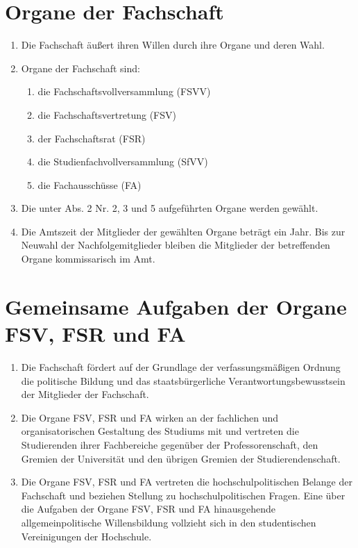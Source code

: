 \documentclass{article}
\begin{document}
\section{Organe der Fachschaft}
\begin{enumerate}[(1)]
\item Die Fachschaft äußert ihren Willen durch ihre Organe und deren Wahl.
\item Organe der Fachschaft sind:
\begin{enumerate}[1.]
    \item die Fachschaftsvollversammlung (FSVV)
    \item die Fachschaftsvertretung (FSV)
    \item der Fachschaftsrat (FSR)
    \item die Studienfachvollversammlung (SfVV)
	\item die Fachausschüsse (FA)
\end{enumerate}
\item Die unter Abs. 2 Nr. 2, 3 und 5 aufgeführten Organe werden gewählt.
\item Die Amtszeit der Mitglieder der gewählten Organe beträgt ein Jahr. Bis zur Neuwahl der Nachfolgemitglieder bleiben die Mitglieder der betreffenden Organe kommissarisch im Amt.
\end{enumerate}

\section{Gemeinsame Aufgaben der Organe FSV, FSR und FA}
\begin{enumerate}[(1)]
\item Die Fachschaft fördert auf der Grundlage der verfassungsmäßigen Ordnung die politische Bildung und das staatsbürgerliche Verantwortungsbewusstsein der Mitglieder der Fachschaft.
\item Die Organe FSV, FSR und FA wirken an der fachlichen und organisatorischen Gestaltung des Studiums mit und vertreten die Studierenden ihrer Fachbereiche gegenüber der Professorenschaft, den Gremien der Universität und den übrigen Gremien der Studierendenschaft.
\item Die Organe FSV, FSR und FA vertreten die hochschulpolitischen Belange der Fachschaft und beziehen Stellung zu hochschulpolitischen Fragen. Eine über die Aufgaben der Organe FSV, FSR und FA hinausgehende allgemeinpolitische Willensbildung vollzieht sich in den studentischen Vereinigungen der Hochschule.
\end{enumerate}
\end{document}
